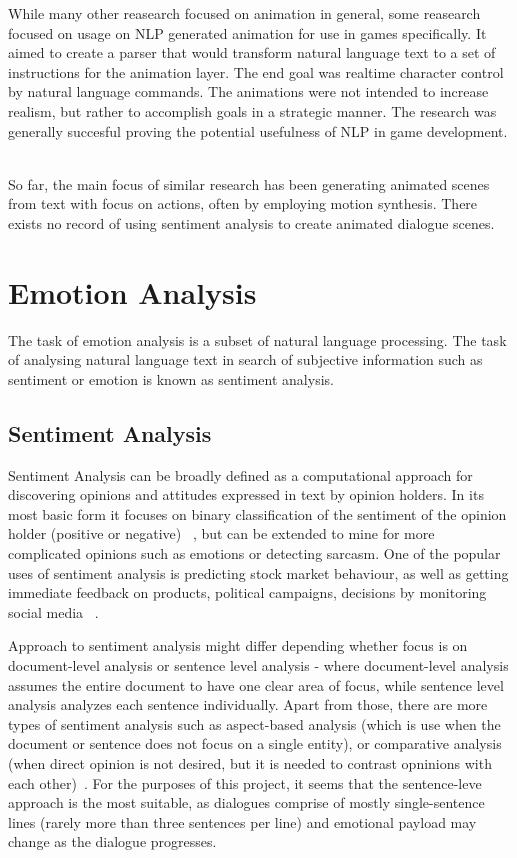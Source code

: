 While many other reasearch focused on animation in general, some reasearch focused on usage on NLP generated animation for use in games specifically. It aimed to create a parser that would transform natural language text to a set of instructions for the animation layer. The end goal was realtime character control by natural language commands. The animations were not intended to increase realism, but rather to accomplish goals in a strategic manner. The research was generally succesful proving the potential usefulness of NLP in game development. ~\cite{animpaper3}

So far, the main focus of similar research has been generating animated scenes from text with focus on actions, often by employing motion synthesis. There exists no record of using  sentiment analysis to create animated dialogue scenes.




\section{Emotion Analysis}

The task of emotion analysis is a subset of natural language processing. The task of analysing natural language text in search of subjective information such as sentiment or emotion is known as sentiment analysis.

\subsection{Sentiment Analysis}
Sentiment Analysis can be broadly defined as a computational approach for discovering opinions and attitudes expressed in text by opinion holders. In its most basic form it focuses on binary classification of the sentiment of the opinion holder (positive or negative) ~\cite{sentimentanal1}, but can be extended to mine for more complicated opinions such as emotions or detecting sarcasm. One of the popular uses of sentiment analysis is predicting stock market behaviour, as well as getting immediate feedback on products, political campaigns, decisions by monitoring social media ~\cite{sentimentanal2}.

Approach to sentiment analysis might differ depending whether focus is on document-level analysis or sentence level analysis - where document-level analysis assumes the entire document to have one clear area of focus, while sentence level analysis analyzes each sentence individually. Apart from those, there are more types of sentiment analysis such as aspect-based analysis (which is use when the document or sentence does not focus on a single entity), or comparative analysis (when direct opinion is not desired, but it is needed to contrast opninions with each other)~\cite{sentimentanal2}. For the purposes of this project, it seems that the sentence-leve approach is the most suitable, as dialogues comprise of mostly single-sentence lines (rarely more than three sentences per line) and emotional payload may change as the dialogue progresses.

